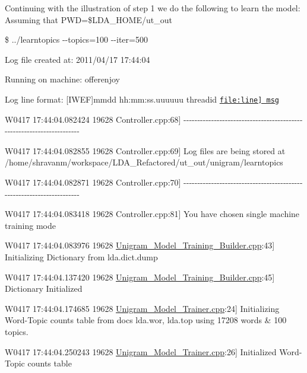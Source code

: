 Continuing with the illustration of step 1 we do the following to learn the model: Assuming that PWD=\$LDA\_\-HOME/ut\_\-out {\ttfamily  }

{\ttfamily \$ ../learntopics -\/-\/topics=100 -\/-\/iter=500 }

{\ttfamily Log file created at: 2011/04/17 17:44:04  }

{\ttfamily Running on machine: offerenjoy  }

{\ttfamily Log line format: \mbox{[}IWEF\mbox{]}mmdd hh:mm:ss.uuuuuu threadid \href{file:line] msg}{\tt file:line\mbox{]} msg}  }

{\ttfamily W0417 17:44:04.082424 19628 Controller.cpp:68\mbox{]} -\/-\/-\/-\/-\/-\/-\/-\/-\/-\/-\/-\/-\/-\/-\/-\/-\/-\/-\/-\/-\/-\/-\/-\/-\/-\/-\/-\/-\/-\/-\/-\/-\/-\/-\/-\/-\/-\/-\/-\/-\/-\/-\/-\/-\/-\/-\/-\/-\/-\/-\/-\/-\/-\/-\/-\/-\/-\/-\/-\/-\/-\/-\/-\/-\/-\/-\/-\/-\/-\/}

{\ttfamily   }

{\ttfamily W0417 17:44:04.082855 19628 Controller.cpp:69\mbox{]} Log files are being stored at /home/shravanm/workspace/LDA\_\-Refactored/ut\_\-out/unigram/learntopics  }

{\ttfamily W0417 17:44:04.082871 19628 Controller.cpp:70\mbox{]} -\/-\/-\/-\/-\/-\/-\/-\/-\/-\/-\/-\/-\/-\/-\/-\/-\/-\/-\/-\/-\/-\/-\/-\/-\/-\/-\/-\/-\/-\/-\/-\/-\/-\/-\/-\/-\/-\/-\/-\/-\/-\/-\/-\/-\/-\/-\/-\/-\/-\/-\/-\/-\/-\/-\/-\/-\/-\/-\/-\/-\/-\/-\/-\/-\/-\/-\/-\/-\/-\/}

{\ttfamily   }

{\ttfamily W0417 17:44:04.083418 19628 Controller.cpp:81\mbox{]} You have chosen single machine training mode  }

{\ttfamily W0417 17:44:04.083976 19628 \hyperlink{_unigram___model___training___builder_8cpp}{Unigram\_\-Model\_\-Training\_\-Builder.cpp}:43\mbox{]} Initializing Dictionary from lda.dict.dump  }

{\ttfamily W0417 17:44:04.137420 19628 \hyperlink{_unigram___model___training___builder_8cpp}{Unigram\_\-Model\_\-Training\_\-Builder.cpp}:45\mbox{]} Dictionary Initialized  }

{\ttfamily W0417 17:44:04.174685 19628 \hyperlink{_unigram___model___trainer_8cpp}{Unigram\_\-Model\_\-Trainer.cpp}:24\mbox{]} Initializing Word-\/Topic counts table from docs lda.wor, lda.top using 17208 words \& 100 topics.  }

{\ttfamily W0417 17:44:04.250243 19628 \hyperlink{_unigram___model___trainer_8cpp}{Unigram\_\-Model\_\-Trainer.cpp}:26\mbox{]} Initialized Word-\/Topic counts table  }

